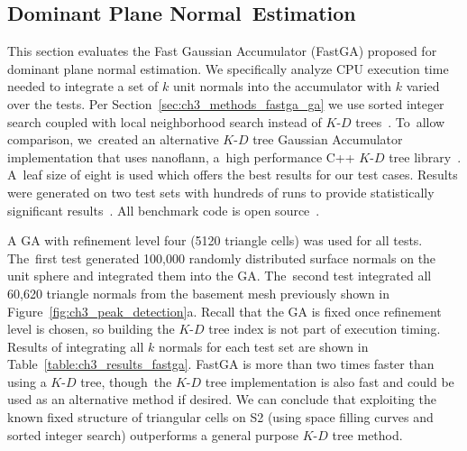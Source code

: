\subsection{Dominant Plane Normal~Estimation}\label{sec:ch3_results_dominant}

This section evaluates the Fast Gaussian Accumulator (FastGA) proposed for dominant plane normal estimation. We specifically analyze CPU execution time needed to integrate a set of $k$ unit normals into the accumulator with $k$ varied over the tests. Per Section~\ref{sec:ch3_methods_fastga_ga} we use sorted integer search coupled with local neighborhood search instead of $K$-$D$ trees~\cite{toony_describing_2015}. To~allow comparison, we~created an alternative $K$-$D$ tree Gaussian Accumulator implementation that uses nanoflann, a~high performance C++ $K$-$D$ tree library~\cite{blanco_nanoflann_2014}. A~leaf size of eight is used which offers the best results for our test cases.  Results were generated on two test sets with hundreds of runs to provide statistically significant results~\cite{noauthor_github_2020-8}. All benchmark code is open source~\cite{Castagno_Github_fastga}. 

A GA with refinement level four (5120 triangle cells) was used for all tests. The~first test generated 100,000 randomly distributed surface normals on the unit sphere and integrated them into the GA. The~second test integrated all 60,620 triangle normals from the basement mesh previously shown in Figure~\ref{fig:ch3_peak_detection}a. Recall that the GA is fixed once refinement level is chosen, so building the $K$-$D$ tree index is not part of execution timing. Results of integrating all $k$ normals for each test set are shown in Table~\ref{table:ch3_results_fastga}. FastGA is more than two times faster than using a $K$-$D$ tree, though~the $K$-$D$ tree implementation is also fast and could be used as an alternative method if desired.  We can conclude that exploiting the known fixed structure of triangular cells on S2 (using space filling curves and sorted integer search) outperforms a general purpose $K$-$D$ tree method. 


